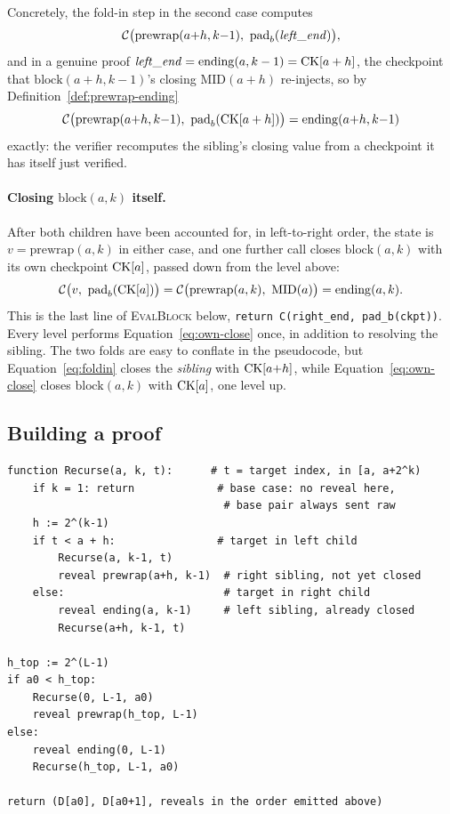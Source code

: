 Concretely, the fold-in step in the second case computes
\begin{equation}
\C\big(\mathrm{prewrap}(a{+}h,k{-}1),\ \mathrm{pad}_b(\mathit{left\_end})\big),
\label{eq:foldin}
\end{equation}
and in a genuine proof $\mathit{left\_end} = \mathrm{ending}(a,k-1) =
\mathrm{CK}[a+h]$, the checkpoint that $\mathrm{block}(a+h,k-1)$'s closing
$\mathrm{MID}(a+h)$ re-injects, so by Definition~\ref{def:prewrap-ending}
\begin{equation}
\C\big(\mathrm{prewrap}(a{+}h,k{-}1),\ \mathrm{pad}_b(\CK[a+h])\big)
= \mathrm{ending}(a{+}h,k{-}1)
\end{equation}
exactly: the verifier recomputes the sibling's closing value from a
checkpoint it has itself just verified.

\paragraph{Closing $\mathrm{block}(a,k)$ itself.} After both children have
been accounted for, in left-to-right order, the state is
$v = \mathrm{prewrap}(a,k)$ in either case, and one further call closes
$\mathrm{block}(a,k)$ with its own checkpoint $\mathrm{CK}[a]$, passed down from
the level above:
\begin{equation}
\mathcal{C}\big(v,\ \mathrm{pad}_b(\mathrm{CK}[a])\big)
= \mathcal{C}\big(\mathrm{prewrap}(a,k),\ \mathrm{MID}(a)\big)
= \mathrm{ending}(a,k).
\label{eq:own-close}
\end{equation}
This is the last line of \textsc{EvalBlock} below,
\texttt{return C(right\_end, pad\_b(ckpt))}. Every level performs
Equation~\eqref{eq:own-close} once, in addition to resolving the sibling.
The two folds are easy to conflate in the pseudocode, but
Equation~\eqref{eq:foldin} closes the \emph{sibling} with $\mathrm{CK}[a{+}h]$,
while Equation~\eqref{eq:own-close} closes $\mathrm{block}(a,k)$ with
$\mathrm{CK}[a]$, one level up.

\subsection{Building a proof}

\begin{algorithm}[H]
\caption{$\textsc{BuildProof}(a_0, L)$ -- prover, given target pair start $a_0$}
\begin{lstlisting}[style=pseudo]
function Recurse(a, k, t):      # t = target index, in [a, a+2^k)
    if k = 1: return             # base case: no reveal here,
                                  # base pair always sent raw
    h := 2^(k-1)
    if t < a + h:                # target in left child
        Recurse(a, k-1, t)
        reveal prewrap(a+h, k-1)  # right sibling, not yet closed
    else:                         # target in right child
        reveal ending(a, k-1)     # left sibling, already closed
        Recurse(a+h, k-1, t)

h_top := 2^(L-1)
if a0 < h_top:
    Recurse(0, L-1, a0)
    reveal prewrap(h_top, L-1)
else:
    reveal ending(0, L-1)
    Recurse(h_top, L-1, a0)

return (D[a0], D[a0+1], reveals in the order emitted above)
\end{lstlisting}
\end{algorithm}

